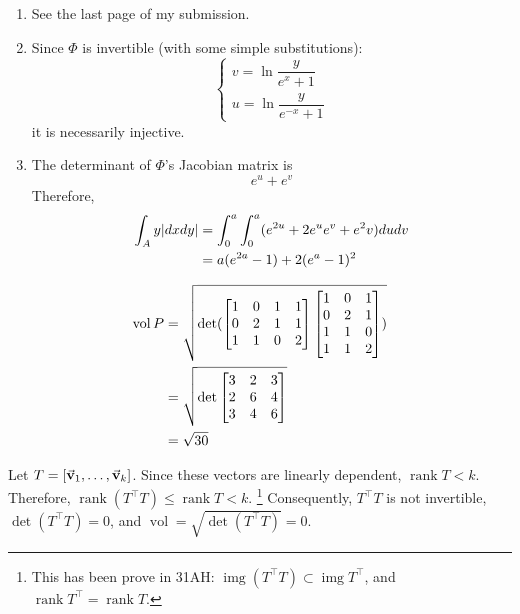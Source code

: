 \documentclass{homework}
\DeclareMathOperator{\img}{img}
\DeclareMathOperator{\rank}{rank}
\DeclareMathOperator{\vol}{vol}
\begin{document}
\begin{problem}{8}
\begin{enumerate}
\item See the last page of my submission.
\item Since $\Phi$ is invertible (with some simple substitutions):
$$\left\{\begin{aligned}
v = \ln\dfrac{y}{e^x+1} \\
u = \ln\dfrac{y}{e^{-x}+1}
\end{aligned}\right.$$
it is necessarily injective. \QED
\item
The determinant of $\Phi$'s Jacobian matrix is
$$e^u+e^v$$
Therefore,
\begin{align*}
\int_A y\lvert dxdy\rvert
&= \int_0^a\int_0^a (e^{2u}+2e^ue^v+e^2v) dudv \\
&= a(e^{2a}-1) + 2(e^a-1)^2
\end{align*}
\end{enumerate}
\end{problem}

\begin{problem}{9}
\begin{align*}
\vol P &= \sqrt{\det(
\bmat{1&0&1&1\\0&2&1&1\\1&1&0&2}
\bmat{1&0&1\\0&2&1\\1&1&0\\1&1&2})} \\
&= \sqrt{\det{\bmat{3&2&3\\2&6&4\\3&4&6}}} \\
&= \sqrt{30}
\end{align*}
\end{problem}

\begin{problem}{10}
Let $T = [\vec{\mathbf{v}}_1, \hdots, \vec{\mathbf{v}}_k]$. Since these vectors are linearly
dependent, $\rank{T} < k$. Therefore, $\rank(T^\top T) \leq \rank{T} < k$.
\footnote{This has been prove in 31AH: $\img(T^\top T) \subset \img T^\top$,
and $\rank T^\top = \rank T$.}
Consequently, $T^\top T$ is not invertible, $\det(T^\top T) = 0$, and
$\vol = \sqrt{\det(T^\top T)} = 0$. \QED
\end{problem}
\end{document}
